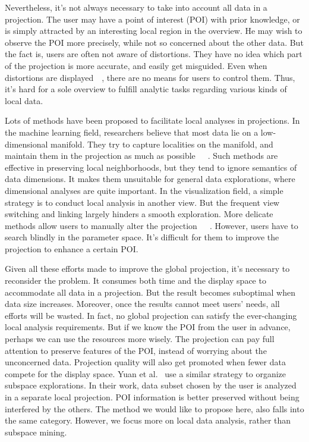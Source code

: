 Nevertheless, it's not always necessary to take into account all data in a projection. The user may have a point of interest (POI) with prior knowledge, or is simply attracted by an interesting local region in the overview. He may wish to observe the POI more precisely, while not so concerned about the other data. But the fact is, users are often not aware of distortions. They have no idea which part of the projection is more accurate, and easily get misguided. Even when distortions are displayed~\cite{DBLP:journals/ijon/Aupetit07}~\cite{DBLP:journals/cgf/LiuWBP14}, there are no means for users to control them. Thus, it's hard for a sole overview to fulfill analytic tasks regarding various kinds of local data.

Lots of methods have been proposed to facilitate local analyses in projections. In the machine learning field, researchers believe that most data lie on a low-dimensional manifold. They try to capture localities on the manifold, and maintain them in the projection as much as possible~\cite{DBLP:journals/neco/BelkinN03}~\cite{roweis2000nonlinear}~\cite{DBLP:journals/corr/cs-LG-0212008}. Such methods are effective in preserving local neighborhoods, but they tend to ignore semantics of data dimensions. It makes them unsuitable for general data explorations, where dimensional analyses are quite important. In the visualization field, a simple strategy is to conduct local analysis in another view. But the frequent view switching and linking largely hinders a smooth exploration. More delicate methods allow users to manually alter the projection~\cite{DBLP:journals/cgf/JeongZFRC09}~\cite{DBLP:journals/tvcg/NamM13}~\cite{DBLP:journals/tvcg/LehmannT13}. However, users have to search blindly in the parameter space. It's difficult for them to improve the projection to enhance a certain POI.

Given all these efforts made to improve the global projection, it's necessary to reconsider the problem. It consumes both time and the display space to accommodate all data in a projection. But the result becomes suboptimal when data size increases. Moreover, once the results cannot meet users' needs, all efforts will be wasted. In fact, no global projection can satisfy the ever-changing local analysis requirements. But if we know the POI from the user in advance, perhaps we can use the resources more wisely. The projection can pay full attention to preserve features of the POI, instead of worrying about the unconcerned data. Projection quality will also get promoted when fewer data compete for the display space. Yuan et al.~\cite{DBLP:journals/tvcg/YuanRWG13} use a similar strategy to organize subspace explorations. In their work, data subset chosen by the user is analyzed in a separate local projection. POI information is better preserved without being interfered by the others. The method we would like to propose here, also falls into the same category. However, we focus more on local data analysis, rather than subspace mining.

